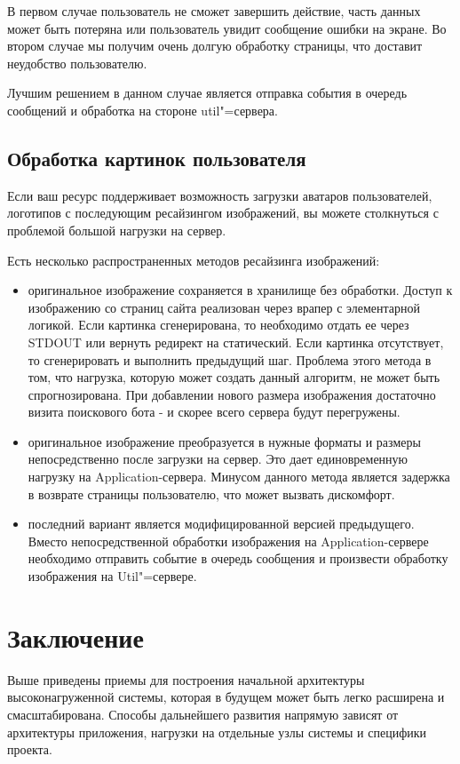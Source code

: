 \documentclass[10pt, a5paper]{article}
\begin{document}
В первом случае пользователь не сможет завершить действие, часть данных может быть потеряна или пользователь увидит сообщение ошибки на экране. 
Во втором случае мы получим очень долгую обработку страницы, что доставит неудобство пользователю. 

Лучшим решением в данном случае является отправка события в очередь сообщений и обработка на стороне util"=сервера. 

\subsection*{Обработка картинок пользователя}
Если ваш ресурс поддерживает возможность загрузки аватаров пользователей, логотипов с последующим ресайзингом изображений, вы можете столкнуться с проблемой большой нагрузки на сервер. 

Есть несколько распространенных методов ресайзинга изображений:

\begin{itemize}
\item оригинальное изображение сохраняется в хранилище без обработки. Доступ к изображению со страниц сайта реализован через врапер с элементарной логикой. Если картинка сгенерирована, то необходимо отдать ее через STDOUT или вернуть редирект на статический. Если картинка отсутствует, то сгенерировать и выполнить предыдущий шаг. Проблема этого метода в том, что нагрузка, которую может создать данный алгоритм, не может быть спрогнозирована.  При добавлении нового размера изображения достаточно визита поискового бота - и скорее всего сервера будут перегружены. 
\item оригинальное изображение преобразуется в нужные форматы и размеры непосредственно после загрузки на сервер. Это дает единовременную нагрузку на Application-сервера. Минусом данного метода является задержка в возврате страницы пользователю, что может вызвать дискомфорт.
\item последний вариант является модифицированной версией \linebreak предыдущего. Вместо непосредственной обработки изображения на Application-сервере необходимо отправить событие в очередь сообщения и произвести обработку изображения на Util"=сервере. 
\end{itemize}

\section*{Заключение}

Выше приведены приемы для построения начальной архитектуры высоконагруженной системы, которая в будущем может быть легко расширена и  смасштабирована. Способы дальнейшего развития напрямую зависят от архитектуры приложения, нагрузки на отдельные узлы системы и специфики проекта.
\end{document}
